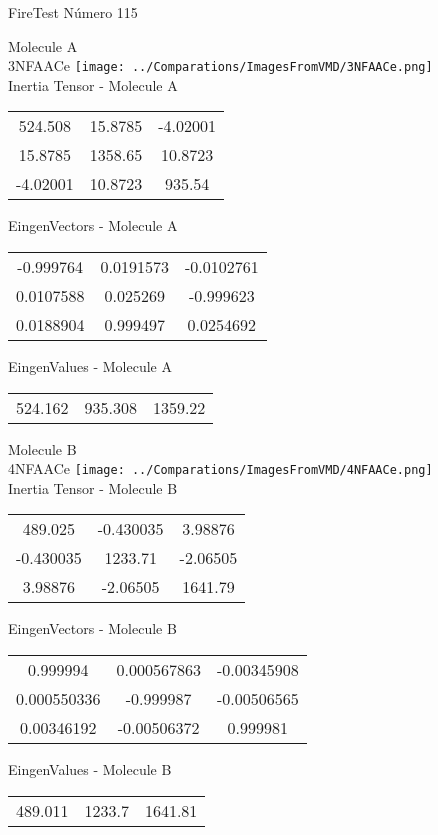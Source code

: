 \vtab[-2cm]
\begin{center}
{\large FireTest \tab Número 115}
\end{center}
\begin{multicols}{2}
\begin{center}

Molecule A \\ 
3NFAACe
\texttt{[image: ../Comparations/ImagesFromVMD/3NFAACe.png]}
\\
Inertia Tensor - Molecule A \\
\vtab

\begin{tabular}{|c c c|}
524.508	 & 	15.8785	 & 	-4.02001	 \\
15.8785	 & 	1358.65	 & 	10.8723	 \\
-4.02001	 & 	10.8723	 & 	935.54
\end{tabular}

\vtab
 EingenVectors - Molecule A     \\
\vtab
\begin{tabular}{|c c c|}
-0.999764	 & 	0.0191573	 & 	-0.0102761	 \\
0.0107588	 & 	0.025269	 & 	-0.999623	 \\
0.0188904	 & 	0.999497	 & 	0.0254692
\end{tabular}

\vtab
 EingenValues - Molecule A     \\
\vtab
\begin{tabular}{|c c c|}
524.162	 & 	935.308	 & 	1359.22	 \\
\end{tabular}
\columnbreak

Molecule B \\ 
4NFAACe
\texttt{[image: ../Comparations/ImagesFromVMD/4NFAACe.png]}
\\
Inertia Tensor - Molecule B \\
\vtab

\begin{tabular}{|c c c|}
489.025	 & 	-0.430035	 & 	3.98876	 \\
-0.430035	 & 	1233.71	 & 	-2.06505	 \\
3.98876	 & 	-2.06505	 & 	1641.79
\end{tabular}

\vtab
 EingenVectors - Molecule B     \\
\vtab
\begin{tabular}{|c c c|}
0.999994	 & 	0.000567863	 & 	-0.00345908	 \\
0.000550336	 & 	-0.999987	 & 	-0.00506565	 \\
0.00346192	 & 	-0.00506372	 & 	0.999981
\end{tabular}

\vtab
 EingenValues - Molecule B     \\
\vtab
\begin{tabular}{|c c c|}
489.011	 & 	1233.7	 & 	1641.81	 \\
\end{tabular}

\end{center}
\end{multicols}
